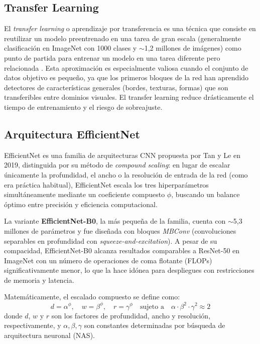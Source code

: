 \documentclass[12pt,a4paper]{article}
\begin{document}
\subsection{Transfer Learning}

El \textit{transfer learning} o aprendizaje por transferencia es una técnica que consiste en reutilizar un modelo preentrenado en una tarea de gran escala (generalmente clasificación en ImageNet con 1000 clases y $\sim$1,2 millones de imágenes) como punto de partida para entrenar un modelo en una tarea diferente pero relacionada \cite{pan2010survey}. Esta aproximación es especialmente valiosa cuando el conjunto de datos objetivo es pequeño, ya que los primeros bloques de la red han aprendido detectores de características generales (bordes, texturas, formas) que son transferibles entre dominios visuales. El transfer learning reduce drásticamente el tiempo de entrenamiento y el riesgo de sobreajuste.

\subsection{Arquitectura EfficientNet}

EfficientNet \cite{tan2019efficientnet} es una familia de arquitecturas CNN propuesta por Tan y Le en 2019, distinguida por su método de \textit{compound scaling}: en lugar de escalar únicamente la profundidad, el ancho o la resolución de entrada de la red (como era práctica habitual), EfficientNet escala los tres hiperparámetros simultáneamente mediante un coeficiente compuesto $\phi$, buscando un balance óptimo entre precisión y eficiencia computacional.

La variante \textbf{EfficientNet-B0}, la más pequeña de la familia, cuenta con $\sim$5,3 millones de parámetros y fue diseñada con bloques \textit{MBConv} (convoluciones separables en profundidad con \textit{squeeze-and-excitation}). A pesar de su compacidad, EfficientNet-B0 alcanza resultados comparables a ResNet-50 en ImageNet con un número de operaciones de coma flotante (FLOPs) significativamente menor, lo que la hace idónea para despliegues con restricciones de memoria y latencia.

Matemáticamente, el escalado compuesto se define como:
\begin{equation}
    d = \alpha^\phi, \quad w = \beta^\phi, \quad r = \gamma^\phi
    \quad \text{sujeto a} \quad \alpha \cdot \beta^2 \cdot \gamma^2 \approx 2
\end{equation}
donde $d$, $w$ y $r$ son los factores de profundidad, ancho y resolución, respectivamente, y $\alpha, \beta, \gamma$ son constantes determinadas por búsqueda de arquitectura neuronal (NAS).
\end{document}
